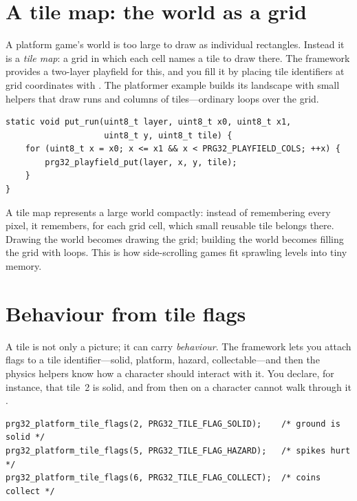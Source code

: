 \section{A tile map: the world as a grid}

A platform game's world is too large to draw as individual rectangles. Instead it
is a \emph{tile map}: a grid in which each cell names a tile to draw there. The
framework provides a two-layer playfield for this, and you fill it by placing tile
identifiers at grid coordinates with  \citep{prg32repo}.
The platformer example builds its landscape with small helpers that draw runs and
columns of tiles---ordinary loops over the grid.

\begin{lstlisting}[style=c,caption={Filling a run of ground tiles with a loop. The platformer uses helpers like this to lay out its world.}]
static void put_run(uint8_t layer, uint8_t x0, uint8_t x1,
                    uint8_t y, uint8_t tile) {
    for (uint8_t x = x0; x <= x1 && x < PRG32_PLAYFIELD_COLS; ++x) {
        prg32_playfield_put(layer, x, y, tile);
    }
}
\end{lstlisting}

\begin{prgconcept}
A tile map represents a large world compactly: instead of remembering every pixel,
it remembers, for each grid cell, which small reusable tile belongs there. Drawing
the world becomes drawing the grid; building the world becomes filling the grid
with loops. This is how side-scrolling games fit sprawling levels into tiny
memory.
\end{prgconcept}

\section{Behaviour from tile flags}

A tile is not only a picture; it can carry \emph{behaviour}. The framework lets you
attach flags to a tile identifier---solid, platform, hazard, collectable---and then
the physics helpers know how a character should interact with it. You declare, for
instance, that tile~2 is solid, and from then on a character cannot walk through
it \citep{prg32repo}.

\begin{lstlisting}[style=c,caption={Giving tiles behaviour. Marking a tile solid makes the physics helper treat it as ground or wall.}]
prg32_platform_tile_flags(2, PRG32_TILE_FLAG_SOLID);    /* ground is solid */
prg32_platform_tile_flags(5, PRG32_TILE_FLAG_HAZARD);   /* spikes hurt */
prg32_platform_tile_flags(6, PRG32_TILE_FLAG_COLLECT);  /* coins collect */
\end{lstlisting}

